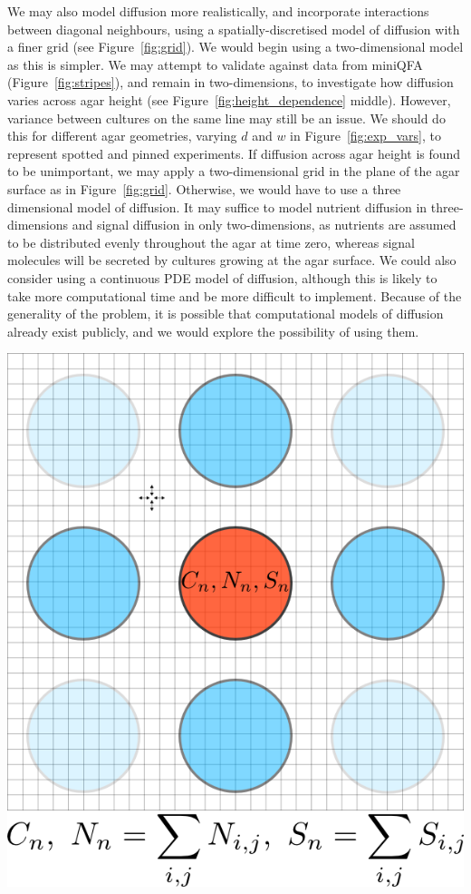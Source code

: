We may also model diffusion more realistically, and incorporate
interactions between diagonal neighbours, using a
spatially-discretised model of diffusion with a finer grid (see
Figure~\ref{fig:grid}). We would begin using a two-dimensional model
as this is simpler. We may attempt to validate against data from
miniQFA (Figure~\ref{fig:stripes}), and remain in two-dimensions, to
investigate how diffusion varies across agar height (see
Figure~\ref{fig:height_dependence} middle). However, variance between
cultures on the same line may still be an issue. We should do this for
different agar geometries, varying \(d\) and \(w\) in
Figure~\ref{fig:exp_vars}, to represent spotted and pinned
experiments. If diffusion across agar height is found to be
unimportant, we may apply a two-dimensional grid in the plane of the
agar surface as in Figure~\ref{fig:grid}. Otherwise, we would have to
use a three dimensional model of diffusion. It may suffice to model
nutrient diffusion in three-dimensions and signal diffusion in only
two-dimensions, as nutrients are assumed to be distributed evenly
throughout the agar at time zero, whereas signal molecules will be
secreted by cultures growing at the agar surface. We could also
consider using a continuous PDE model of diffusion, although this is
likely to take more computational time and be more difficult to
implement. Because of the generality of the problem, it is possible
that computational models of diffusion already exist publicly, and we
would explore the possibility of using them.

\begin{Figure}
  \centering
  \includegraphics[width=\linewidth]{square_array_grid}
  \label{fig:grid}
\end{Figure}

